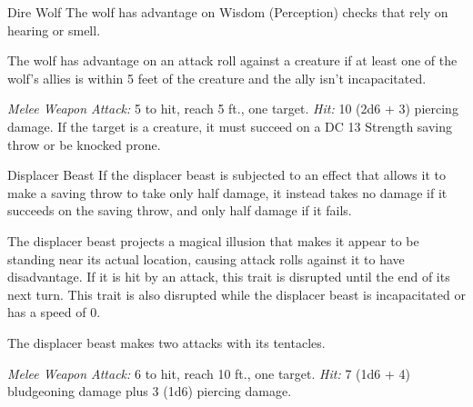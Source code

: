 \documentclass[10pt,a4paper,twoside,bg=print,twocolumn,openany,nodeprecatedcode]{dndbook}
\begin{document}
\begin{DndMonster}[float=t]{Dire Wolf}
\DndMonsterBasics[
armor-class = {14 (natural armor)},
hit-points = {\DndDice{5d10 + 10}},
speed = {50 ft.}
]
\DndMonsterAbilityScores[
 str = 17,
 dex = 15,
 con = 15,
 int = 3,
 wis = 12,
 cha = 7
]
\DndMonsterDetails[
skills = {Perception +3, Stealth +4},
challenge = 1,
]
The wolf has advantage on Wisdom (Perception) checks that rely on hearing or smell.

The wolf has advantage on an attack roll against a creature if at least one of the wolf's allies is within 5 feet of the creature and the ally isn't incapacitated.

\textsl{Melee Weapon Attack:} 5 to hit, reach 5 ft., one target. \textsl{Hit:} 10 (2d6 + 3) piercing damage. If the target is a creature, it must succeed on a DC 13 Strength saving throw or be knocked prone.

\end{DndMonster}



\begin{DndMonster}[float=t]{Displacer Beast}
\DndMonsterBasics[
armor-class = {13 (natural armor)},
hit-points = {\DndDice{10d10 + 30}},
speed = {40 ft.}
]
\DndMonsterAbilityScores[
 str = 18,
 dex = 15,
 con = 16,
 int = 6,
 wis = 12,
 cha = 8
]
\DndMonsterDetails[
senses = {darkvision 60 ft., passive perception 11},
challenge = 3,
]
If the displacer beast is subjected to an effect that allows it to make a saving throw to take only half damage, it instead takes no damage if it succeeds on the saving throw, and only half damage if it fails.

The displacer beast projects a magical illusion that makes it appear to be standing near its actual location, causing attack rolls against it to have disadvantage. If it is hit by an attack, this trait is disrupted until the end of its next turn. This trait is also disrupted while the displacer beast is incapacitated or has a speed of 0.

The displacer beast makes two attacks with its tentacles.

\textsl{Melee Weapon Attack:} 6 to hit, reach 10 ft., one target. \textsl{Hit:} 7 (1d6 + 4) bludgeoning damage plus 3 (1d6) piercing damage.

\end{DndMonster}
\end{document}
